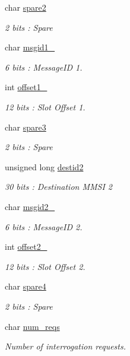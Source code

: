 \begin{DoxyCompactItemize}
char \mbox{\hyperlink{structaismsg__15_a02d1fce5d7d19a977fcd505fd58c0fe9}{spare2}}
\begin{DoxyCompactList}\small\item\em 2 bits \+: Spare \end{DoxyCompactList}\item 
char \mbox{\hyperlink{structaismsg__15_af8082afe248f87124a91b2f54fb41bb3}{msgid1\+\_}}
\begin{DoxyCompactList}\small\item\em 6 bits \+: Message\+ID 1. \end{DoxyCompactList}\item 
int \mbox{\hyperlink{structaismsg__15_a45c0f6e51d8791cb564b1b0cc425b8fb}{offset1\+\_}}
\begin{DoxyCompactList}\small\item\em 12 bits \+: Slot Offset 1. \end{DoxyCompactList}\item 
char \mbox{\hyperlink{structaismsg__15_a69540d23c6e27a295fab50a7173689df}{spare3}}
\begin{DoxyCompactList}\small\item\em 2 bits \+: Spare \end{DoxyCompactList}\item 
unsigned long \mbox{\hyperlink{structaismsg__15_a255aa983705371f28ea9ea335ee6781a}{destid2}}
\begin{DoxyCompactList}\small\item\em 30 bits \+: Destination M\+M\+SI 2 \end{DoxyCompactList}\item 
char \mbox{\hyperlink{structaismsg__15_a31e9e533e475f0d1646ab623908a559e}{msgid2\+\_}}
\begin{DoxyCompactList}\small\item\em 6 bits \+: Message\+ID 2. \end{DoxyCompactList}\item 
int \mbox{\hyperlink{structaismsg__15_ac33e929bc28d613bf7435edc3c68c1e9}{offset2\+\_}}
\begin{DoxyCompactList}\small\item\em 12 bits \+: Slot Offset 2. \end{DoxyCompactList}\item 
char \mbox{\hyperlink{structaismsg__15_ad1023e1bd8b96e3df34537e36075de2b}{spare4}}
\begin{DoxyCompactList}\small\item\em 2 bits \+: Spare \end{DoxyCompactList}\item 
char \mbox{\hyperlink{structaismsg__15_a6201a327ecf8624a35b434e8e88815c6}{num\+\_\+reqs}}
\begin{DoxyCompactList}\small\item\em Number of interrogation requests. \end{DoxyCompactList}\end{DoxyCompactItemize}


